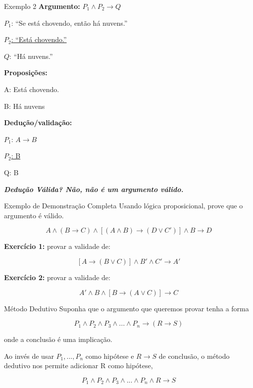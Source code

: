 \documentclass[aspectratio=169]{beamer}
\begin{document}
\begin{frame}{Exemplo 2}
    \textbf{Argumento:} $P_1 \wedge P_2 \rightarrow Q$

    $P_1$: ``Se está chovendo, então há nuvens.''

    \underline{$P_2$: ``Está chovendo.''}

    $Q$: ``Há nuvens.''

    \vspace{3mm}
    \textbf{Proposições:}

    A: Está chovendo.

    B: Há nuvens
    \vspace{3mm}

    \textbf{Dedução/validação:}

    $P_1$: $A \rightarrow B$

    \underline{$P_2$: B}

    Q: B
    \vspace{4mm}

    \textit{\textbf{Dedução Válida? Não, não é um argumento válido.}}


\end{frame}

\begin{frame}{Exemplo de Demonstração Completa}
    Usando lógica proposicional, prove que o argumento é válido.

    \[ A \wedge (B \rightarrow C) \wedge \left[ (A \wedge B) \rightarrow (D \vee C') \right] \wedge B \rightarrow D \]

    \textbf{Exercício 1:} provar a validade de:

    \[ \left[ A \rightarrow (B \vee C) \right] \wedge B' \wedge C' \rightarrow A' \]
    \vspace{4mm}

    \textbf{Exercício 2:} provar a validade de:

    \[ A' \wedge B \wedge [B \rightarrow (A \vee C)] \rightarrow C \]

\end{frame}

\begin{frame}{Método Dedutivo}
    Suponha que o argumento que queremos provar tenha a forma

    \[ P_1 \wedge P_2 \wedge P_3 \wedge ... \wedge P_n \rightarrow (R \rightarrow S) \]

    onde a conclusão é uma implicação.


    Ao invés de usar $P_1, ... , P_n$ como hipótese e $R \rightarrow S$ de conclusão,
    o método dedutivo nos permite adicionar R como hipótese,

    \[ P_1 \wedge P_2 \wedge P_3 \wedge ... \wedge P_n \wedge R \rightarrow S \]

\end{frame}
\end{document}
